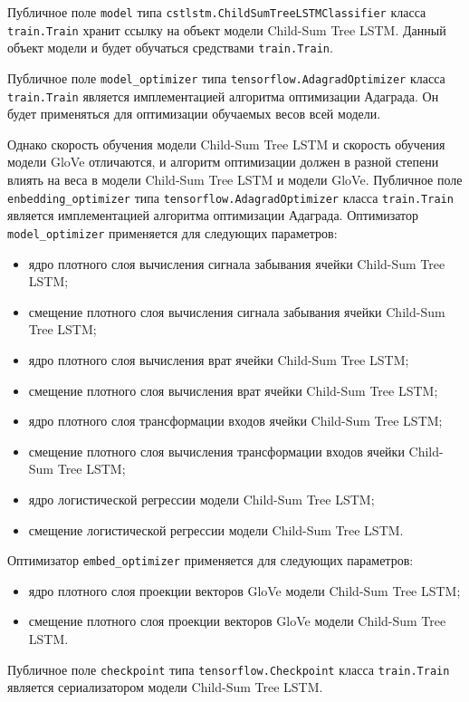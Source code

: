 Публичное поле \texttt{model} типа \texttt{cstlstm.ChildSumTreeLSTMClassifier} класса \texttt{train.Train} хранит ссылку на объект модели Child-Sum Tree LSTM\@. Данный объект модели и будет обучаться средствами \texttt{train.Train}.

Публичное поле \texttt{model\_optimizer} типа \texttt{tensorflow.AdagradOptimizer} класса \texttt{train.Train} является имплементацией алгоритма оптимизации Адаграда. Он будет применяться для оптимизации обучаемых весов всей модели.

Однако скорость обучения модели Child-Sum Tree LSTM и скорость обучения модели GloVe отличаются, и алгоритм оптимизации должен в разной степени влиять на веса в модели Child-Sum Tree LSTM и модели GloVe. Публичное поле \texttt{enbedding\_optimizer} типа \texttt{tensorflow.AdagradOptimizer} класса \texttt{train.Train} является имплементацией алгоритма оптимизации Адаграда. Оптимизатор \texttt{model\_optimizer} применяется для следующих параметров:
\begin{itemize}
\item ядро плотного слоя вычисления сигнала забывания ячейки Child-Sum Tree LSTM\@;
\item смещение плотного слоя вычисления сигнала забывания ячейки Child-Sum Tree LSTM\@;
\item ядро плотного слоя вычисления врат ячейки Child-Sum Tree LSTM\@;
\item смещение плотного слоя вычисления врат ячейки Child-Sum Tree LSTM\@;
\item ядро плотного слоя трансформации входов ячейки Child-Sum Tree LSTM\@;
\item смещение плотного слоя вычисления трансформации входов ячейки Child-Sum Tree LSTM\@;
\item ядро логистической регрессии модели Child-Sum Tree LSTM\@;
\item смещение логистической регрессии модели Child-Sum Tree LSTM\@.
\end{itemize}
Оптимизатор \texttt{embed\_optimizer} применяется для следующих параметров:
\begin{itemize}
\item ядро плотного слоя проекции векторов GloVe модели Child-Sum Tree LSTM\@;
\item смещение плотного слоя проекции векторов GloVe модели Child-Sum Tree LSTM\@.
\end{itemize}

Публичное поле \texttt{checkpoint} типа \texttt{tensorflow.Checkpoint} класса \texttt{train.Train} является сериализатором модели Child-Sum Tree LSTM\@.


